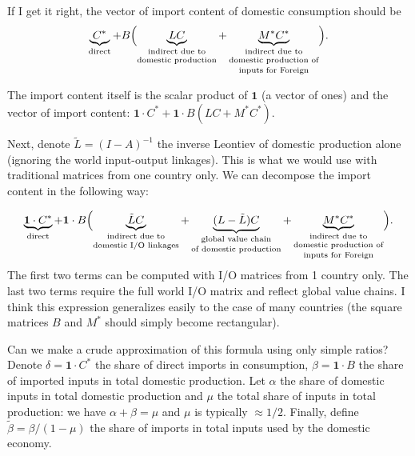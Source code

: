 \documentclass[A4]{article}
\renewcommand{\vec}{\boldsymbol}
\begin{document}
If I get it right, the vector of import content of domestic
consumption should be 
\begin{equation*}
  \underbrace{C^*}_\text{direct} +
  B\Bigl (\underbrace{LC}_\text{\shortstack{indirect due to\\ domestic
      production}}+\underbrace{M^*C^*}_\text{\shortstack{indirect due
      to\\ domestic production of \\ inputs for Foreign}}\Bigr).
\end{equation*}

The import content itself is the scalar product of $\vec 1$ (a vector
of ones) and the vector of import content: $\vec 1\cdot C^*+\vec
1\cdot B(LC+M^*C^*)$.

Next, denote $\tilde L = (I-A)^{-1}$ the inverse Leontiev of domestic
production alone (ignoring the world input-output linkages). This is
what we would use with traditional matrices from one country only. We
can decompose the import content in the following way:

\begin{equation}
\label{eq1}
  \underbrace{\vec 1 \cdot C^*}_\text{direct} +
  \vec 1 \cdot B\Bigl (\underbrace{\tilde L C}_\text{\shortstack{indirect due
      to\\ domestic I/O linkages}} + \underbrace{(L-\tilde L)
    C}_\text{\shortstack{global value chain \\ of domestic
      production}}+\underbrace{M^*C^*}_\text{\shortstack{indirect due
      to\\ domestic production of \\ inputs for Foreign}} 
  \Bigr).
\end{equation}
The first two terms can be computed with I/O matrices from 1 country
only. The last two terms require the full world I/O matrix and reflect
global value chains. I think this expression generalizes easily to the
case of many countries (the square matrices $B$ and $M^*$ should simply become rectangular).

Can we make a crude approximation of this formula using only simple
ratios?
Denote $\delta = \vec 1\cdot C^*$ the share of direct imports in
consumption, $\beta = \vec 1 \cdot B$ the share of imported inputs in
total domestic production. Let $\alpha$ the share of domestic inputs in total
domestic production and $\mu$ the total share of inputs in total
production: we have $\alpha+\beta=\mu$ and $\mu$ is typically $\approx
1/2$. Finally, define $\tilde \beta = \beta/(1-\mu)$ the share of
imports in total inputs used by the domestic economy.
\end{document}
